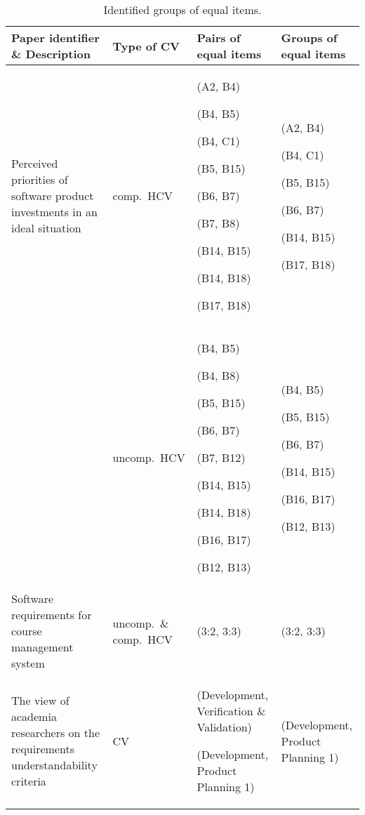 \begin{table*}
\scriptsize
\caption{\label{tab:ECVresult}Identified groups of equal items.}

\begin{tabular}{|>{\centering}p{}|>{\centering}p{}|>{\centering}p{}|>{\centering}p{}|}
\hline 
Paper identifier \& Description  & Type of CV  & Pairs of equal items  & Groups of equal items\tabularnewline
\hline 
\citet{Barney2009} Perceived priorities of software product investments
in an ideal situation  & comp.\ HCV & (A2, B4)

(B4, B5)

(B4, C1)

(B5, B15)

(B6, B7)

(B7, B8)

(B14, B15)

(B14, B18)

(B17, B18) & (A2, B4)

(B4, C1)

(B5, B15)

(B6, B7)

(B14, B15)

(B17, B18)\tabularnewline
\cline{2-4}
 & uncomp.\ HCV & (B4, B5)

(B4, B8)

(B5, B15)

(B6, B7)

(B7, B12)

(B14, B15)

(B14, B18)

(B16, B17)

(B12, B13) & (B4, B5)

(B5, B15)

(B6, B7)

(B14, B15)

(B16, B17)

(B12, B13)\tabularnewline
\hline 
\citet{Berander2009a} Software requirements for course management system  & uncomp.\ \& comp.\ HCV  & (3:2, 3:3) & (3:2, 3:3)\tabularnewline
\hline 
\citet{Svahnberg2008} The view of academia researchers
on the requirements understandability criteria  & CV & (Development, Verification \& Validation)

(Development, Product Planning 1) & (Development, Product Planning 1)\tabularnewline
\hline
\end{tabular}%
\end{table*}


